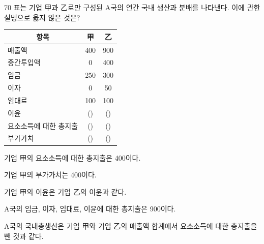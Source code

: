 \begin{question}{70}
표는 기업 甲과 乙로만 구성된 A국의 연간 국내 생산과 분배를 나타낸다. 이에 관한 설명으로 옳지 않은 것은?
\par{\small\centering
\begin{tabular}{|l|c|c|}\hline
\multicolumn{1}{|c|}{항목} & 甲 & 乙 \\ \hline
매출액 & 400 & 900 \\ \hline
중간투입액 & 0 & 400 \\ \hline
임금 & 250 & 300 \\ \hline
이자 & 0 & 50 \\ \hline
임대료 & 100 & 100 \\ \hline
이윤 & (\hspace{1em}) & (\hspace{1em}) \\ \hline
요소소득에 대한 총지출 & (\hspace{1em}) & (\hspace{1em}) \\ \hline
부가가치 & (\hspace{1em}) & (\hspace{1em}) \\ \hline
\end{tabular}\par}
\begin{choices}
  \item 기업 甲의 요소소득에 대한 총지출은 400이다.
  \item 기업 甲의 부가가치는 400이다.
  \item 기업 甲의 이윤은 기업 乙의 이윤과 같다.
  \item A국의 임금, 이자, 임대료, 이윤에 대한 총지출은 900이다.
  \item A국의 국내총생산은 기업 甲와 기업 乙의 매출액 합계에서 요소소득에 대한 총지출을 뺀 것과 같다.
\end{choices}
\end{question}
